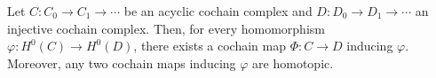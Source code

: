 Let $C : C_0 \to C_1 \to \cdots$ be an acyclic cochain complex and $D : D_0 \to D_1 \to \cdots$ an injective cochain complex. Then, for every homomorphism $\varphi : H^0(C) \to H^0(D)$, there exists a cochain map $\Phi : C \to D$ inducing $\varphi$. Moreover, any two cochain maps inducing $\varphi$ are homotopic.